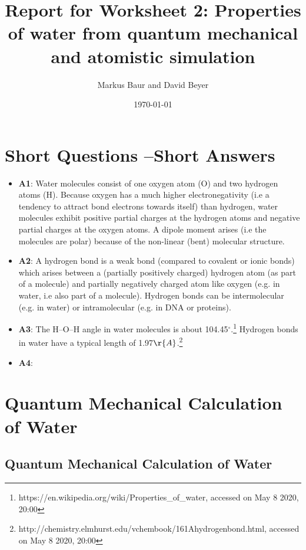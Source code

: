 \documentclass[a4paper,10pt,bibtotoc]{scrartcl}
\begin{document}
\titlehead{Simulation Methods in Physics II \hfill SS 2020}
\title{Report for Worksheet 2: Properties of water from quantum mechanical and atomistic simulation}
\author{Markus Baur and David Beyer}
\date{\today}
\maketitle

\tableofcontents

\section{Short Questions --Short Answers}
\begin{itemize}
\item \textbf{A1}: Water molecules consist of one oxygen atom (O) and two hydrogen atoms (H). Because oxygen has a much higher electronegativity (i.e a tendency to attract bond electrons towards itself) than hydrogen, water molecules exhibit positive partial charges at the hydrogen atoms and negative partial charges at the oxygen atoms. A dipole moment arises (i.e the molecules are polar) because of the non-linear (bent) molecular structure.

\item \textbf{A2}: A hydrogen bond is a weak bond (compared to covalent or ionic bonds) which arises between a (partially positively charged) hydrogen atom (as part of a molecule) and partially negatively charged atom like oxygen (e.g. in water, i.e also part of a molecule). Hydrogen bonds can be intermolecular (e.g. in water) or intramolecular (e.g. in DNA or proteins).

\item \textbf{A3}: The H--O--H angle in water molecules is about 104.45$^\circ$.\footnote{https://en.wikipedia.org/wiki/Properties\_of\_water, accessed on May 8 2020, 20:00} Hydrogen bonds in water have a typical length of 1.97$\r{A}$.\footnote{http://chemistry.elmhurst.edu/vchembook/161Ahydrogenbond.html, accessed on May 8 2020, 20:00}

\item \textbf{A4}: 
\end{itemize}

\section{Quantum Mechanical Calculation of Water}
\subsection{Quantum Mechanical Calculation of Water}
\end{document}
